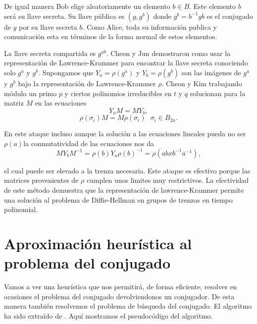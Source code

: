 \documentclass[12pt]{book}
\theoremstyle{definition}
\begin{document}
De igual manera Bob elige aleatoriamente un elemento $b\in B$. Este elemento $b$ será su llave secreta. Su llave pública es $(g,g^b)$ donde $g^b = b^{-1}gb$ es el conjugado de $g$ por su llave secreta $b$. Como Alice, toda su información publica y comunicación esta en términos de la forma normal de estos elementos.

La llave secreta compartida es $g^{ab}$. Cheon y Jun demostraron como usar la representación de Lawrence-Krammer para encontrar la llave secreta conociendo solo $g^a$ y $g^b$. Supongamos que $Y_a=\rho(g^a)$ y  $Y_b=\rho(g^b)$ son las imágenes de $g^a$ y $g^b$ bajo la representación de Lawrence-Krammer $\rho$. Cheon y Kim trabajando módulo un primo $p$ y ciertos polinomios irreducibles en $t$ y $q$ solucionan para la matriz $M$ en las ecuaciones
$$Y_aM=MY_b,$$
$$\rho(\sigma_i)M=M\rho(\sigma_i)\ \ \ \sigma_i\in B_{2n}.$$

En este ataque incluso aunque la solución a las ecuaciones lineales pueda no ser $\rho(a)$la conmutatividad de las ecuaciones nos da
$$MY_bM^{-1}=\rho(b)Y_a\rho(b)^{-1}=\rho(abxb^{-1}a^{-1}),$$

el cual puede ser elevado a la trenza necesaria. Este ataque es efectivo porque las matrices provenientes de $\rho$ cumplen unos limites muy restrictivos. La efectividad de este método demuestra que la representación de lawrence-Krammer permite una solución al problema de Diffie-Hellman en grupos de trenzas en tiempo polinomial.

\section{Aproximación heurística al problema del conjugado}
Vamos a ver una heurística que nos permitirá, de forma eficiente, resolver en ocasiones el problema del conjugado devolviendonos un conjugador. De esta manera también resolvemos el problema de búsqueda del conjugado. El algoritmo ha sido extraído de \cite{Att}. Aquí mostramos el pseudocódigo del algoritmo.
\newline
\end{document}
